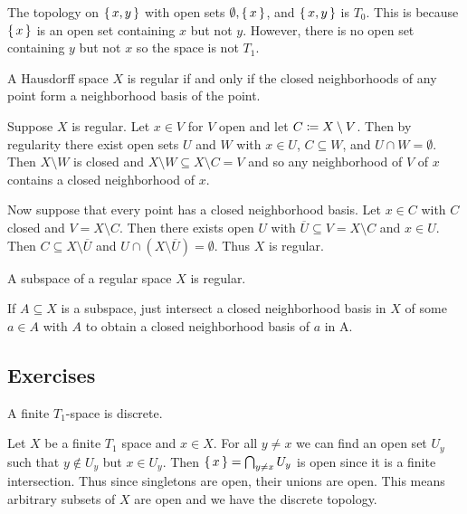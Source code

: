 \documentclass[letterpaper, 11pt, oneside]{book}
\begin{document}
\begin{ex}
  The topology on $\set{x, y}$ with open sets $\emptyset, \set{x}$, and $\set{x, y}$ is $T_{0}$.
  This is because $\set{x}$ is an open set containing $x$ but not $y$.
  However, there is no open set containing $y$ but not $x$ so the space is not $T_{1}$.
\end{ex}

\clearpage

\begin{prop}\label{prop: regular_iff_closed_neighborhood_basis}
  A Hausdorff space $X$ is regular if and only if the closed neighborhoods of any point form a neighborhood basis of the point.
\end{prop}
\begin{pf}
  Suppose $X$ is regular.
  Let $x \in V$ for $V$ open and let $C \coloneqq X \setminus V$.
  Then by regularity there exist open sets $U$ and $W$ with $x \in U$, $C \subseteq W$, and $U \cap W = \emptyset$.
  Then $X \setminus W$ is closed and $X \setminus W \subseteq X \setminus C = V$ and so any neighborhood of $V$ of $x$ contains a closed neighborhood of $x$.

  Now suppose that every point has a closed neighborhood basis.
  Let $x \in C$ with $C$ closed and $V = X \setminus C$.
  Then there exists open $U$ with $\overline{U} \subseteq V = X \setminus C$ and $x \in U$.
  Then $C \subseteq X \setminus \overline{U}$ and $U \cap (X \setminus \overline{U}) = \emptyset$.
  Thus $X$ is regular.
\end{pf}

\begin{cor}
  A subspace of a regular space $X$ is regular.
\end{cor}
\begin{pf}
  If $A \subseteq X$ is a subspace, just intersect a closed neighborhood basis in $X$ of some $a \in A$ with $A$ to obtain a closed neighborhood basis of $a$ in A.
\end{pf}

\clearpage

\subsection*{Exercises}

\begin{exercise}
  A finite $T_{1}$-space is discrete.
\end{exercise}
\begin{pf}
  Let $X$ be a finite $T_{1}$ space and $x \in X$.
  For all $y \neq x$ we can find an open set $U_{y}$ such that $y \notin U_{y}$ but $x \in U_{y}$.
  Then $\set{x} = \bigcap_{y \neq x} U_{y}$ is open since it is a finite intersection.
  Thus since singletons are open, their unions are open.
  This means arbitrary subsets of $X$ are open and we have the discrete topology.
\end{pf}
\end{document}
